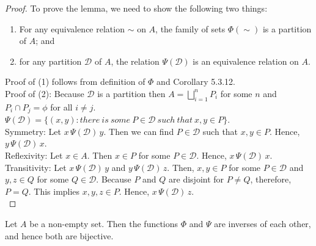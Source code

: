 \documentclass[a4paper,english,12pt]{article}
\begin{document}
\begin{proof}
	To prove the lemma, we need to show the following two things:
	\begin{enumerate}
		\item For any equivalence relation $\sim$ on $A$, the family of sets $\Phi(\sim)$ is a partition of $A$; and
		\item for any partition $\mathcal{D}$ of $A$, the relation $\Psi(\mathcal{D})$ is an equivalence relation on $A$.
	\end{enumerate}
	Proof of (1) follows from definition of $\Phi$ and Corollary 5.3.12.\\
	Proof of (2): Because $\mathcal{D}$ is a partition then $A = \bigsqcup \limits_{i=1}^{n}P_i$ for some $n$ and $P_i\cap P_j = \phi$ for all $i \neq j$. $\Psi (\mathcal{D}) = \{(x,y): there\ is \ some \ P \in \mathcal{D}\ such\ that\ x,y \in P\}$. \\
	Symmetry: Let $x\, \Psi(\mathcal{D})\, y$. Then we can find $P \in \mathcal{D}$ such that $x,y \in P$. Hence, $y\, \Psi(\mathcal{D})\, x$. \\
	Reflexivity: Let $x \in A$. Then $x \in P$ for some $P \in \mathcal{D}$. Hence, $x\, \Psi(\mathcal{D})\, x$.\\
	Transitivity: Let $x\, \Psi(\mathcal{D})\, y$ and $y\, \Psi(\mathcal{D})\, z$. Then, $x,y \in P$ for some $P \in \mathcal{D}$ and $y,z \in Q$ for some $Q \in \mathcal{D}$. Because $P$ and $Q$ are disjoint for $P \neq Q$, therefore, $P = Q$. This implies $x,y,z \in P$. Hence, $x\, \Psi(\mathcal{D})\, z$.\\
\end{proof}

\begin{thm} Let $A$ be a non-empty set. Then the functions $\Phi$ and $\Psi$ are inverses of each other, and hence both are bijective.	
\end{thm}
\end{document}
